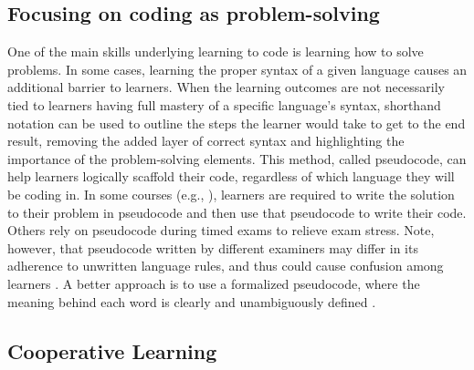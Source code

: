 \subsection{Focusing on coding as problem-solving}
One of the main skills underlying learning to code is learning how to solve problems. 
In some cases, learning the proper syntax of a given language causes an additional barrier to learners.
When the learning outcomes are not necessarily tied to learners having full mastery of a specific language's syntax, shorthand notation can be used to outline the steps the learner would take to get to the end result, removing the added layer of correct syntax and highlighting the importance of the problem-solving elements.
This method, called pseudocode, can help learners logically scaffold their code, regardless of which language they will be coding in.
In some courses (e.g., \cite{olsen_using_2005}), learners are required to write the solution to their problem in pseudocode and then use that pseudocode to write their code.
Others rely on pseudocode during timed exams to relieve exam stress.
Note, however, that pseudocode written by different examiners may differ in its adherence to unwritten language rules, and thus could cause confusion among learners \citep{cutts_code_2014}. A better approach is to use a formalized pseudocode, where the meaning behind each word is clearly and unambiguously defined \citep{cutts_code_2014}.


\subsection{Cooperative Learning} 

